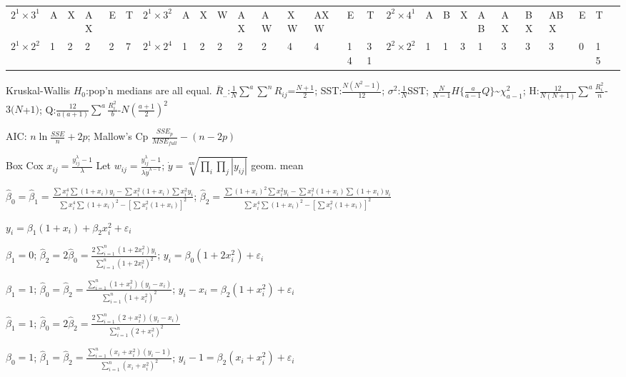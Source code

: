 \documentclass[
  10pt,
  twocolumn]{article}
\begin{document}
\begin{tabular}{ l|l|l|l|l|l||l|l|l|l|l||l|l|l|l|l|l|l|l|l||l|l|l|l|l|l|l }
$2^1\times3^1$&A & X & AX & E & T & $2^1\times3^2$&A&X&W&AX&AW&XW&AXW&E&T&$2^2\times4^1$&A & B & X & AB & AX & BX& ABX& E& T\\
$2^1\times2^2$&1 & 2 & 2  & 2 & 7 & $2^1\times2^4$&1&2&2&2&2&4&4&14&31&$2^2\times2^2$&1 & 1 & 3 & 1  & 3  & 3 & 3  & 0& 15
\end{tabular}

Kruskal-Wallis \(H_0\):pop'n medians are all equal.
\(\bar R_{..}\):\(\frac1N\sum^a\sum^nR_{ij}\)=\(\frac{N+1}2\);
SST:\(\frac{N(N^2-1)}{12}\); \(\sigma^2\):\(\frac1N\)SST;
\(\frac{N}{N-1}H\{\frac{a}{a-1}Q\}\)\textasciitilde{}\(\chi^2_{a-1}\);
H:\(\frac{12}{N(N+1)}\sum^a\frac{R_{i.}^2}{n}\)-\(3(N\)+\(1)\);
Q:\(\frac{12}{a(a+1)}\sum^a\frac{R_{i.}^2}{b}\)-\(N(\frac{a+1}{2})^2\)

AIC: \(n\ln{\frac{SSE}{n}}+2p\); Mallow's Cp
\(\frac{SSE_p}{MSE_{full}}-(n-2p)\)

Box Cox \(x_{ij} = \frac{y^\lambda_{ij}-1}{\lambda}\) Let
\(w_{ij} = \frac{y^\lambda_{ij} -1}{\lambda \dot{y}^{\lambda - 1}}\);
\(\dot{y} = \sqrt[an]{\prod_i \prod_j |y_{ij}|}\) geom. mean

\pagebreak

\(\hat\beta_0=\hat\beta_1=\frac{\sum x_i^4\sum (1+x_i)y_i-\sum x_i^2(1+x_i)\sum x_i^2y_i}{\sum x_i^4\sum (1+x_i)^2-[\sum x_i^2(1+x_i)]^2}\);
\(\hat\beta_2=\frac{\sum (1+x_i)^2\sum x_i^2y_i-\sum x_i^2(1+x_i)\sum (1+x_i)y_i}{\sum x_i^4\sum (1+x_i)^2-[\sum x_i^2(1+x_i)]^2}\)

\(y_i = \beta_1( 1 + x_i) + \beta_2 x_i^2 + \varepsilon_i\)

\dotfill

\(\beta_1=0\);
\(\hat\beta_2 = 2\hat\beta_0=\frac{2\sum_{i=1}^n(1+2x_i^2)y_i}{\sum_{i=1}^n(1+2x_i^2)^2}\);
\(y_i = \beta_0(1 + 2x_i^2) + \varepsilon_i\)

\dotfill

\(\beta_1=1\);
\(\hat\beta_0 =\hat\beta_2=\frac{\sum_{i=1}^n(1+x_i^2)(y_i-x_i)}{\sum_{i=1}^n(1+x_i^2)^2}\);
\(y_i-x_i=\beta_2(1 + x_i^2) + \varepsilon_i\)

\dotfill

\(\hat\beta_1=1\);
\(\hat\beta_0=2\hat\beta_2=\frac{2\sum_{i=1}^n(2+x_i^2)(y_i-x_i)}{\sum_{i=1}^n(2+x_i^2)^2}\)

\dotfill

\(\beta_0=1\);
\(\hat\beta_1=\hat\beta_2=\frac{\sum_{i=1}^n(x_i+x_i^2)(y_i-1)}{\sum_{i=1}^n(x_i+x_i^2)^2}\);
\(y_i-1=\beta_2(x_i + x_i^2) + \varepsilon_i\)
\end{document}
